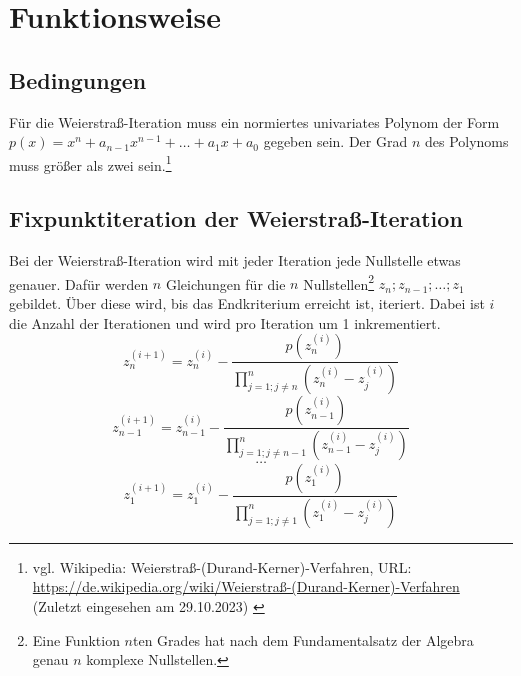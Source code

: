 \documentclass[12pt]{article}
\begin{document}
\section{Funktionsweise}
\subsection{Bedingungen}
Für die Weierstraß-Iteration muss ein normiertes univariates Polynom der Form $p(x) = x^n + a_{n-1} x^{n-1} + \dots + a_1 x + a_0$ gegeben sein. Der Grad $n$ des Polynoms muss größer als zwei sein.\footnote{
    vgl. Wikipedia: Weierstraß-(Durand-Kerner)-Verfahren, URL: \url{https://de.wikipedia.org/wiki/Weierstraß-(Durand-Kerner)-Verfahren} (Zuletzt eingesehen am 29.10.2023)
    \label{ftn:Wikipedia-Weierstraß-Methode}
}

\subsection{Fixpunktiteration der Weierstraß-Iteration}
Bei der Weierstraß-Iteration wird mit jeder Iteration jede Nullstelle etwas genauer. Dafür werden $n$ Gleichungen für die $n$ Nullstellen\footnote{Eine Funktion $n$ten Grades hat nach dem Fundamentalsatz der Algebra genau $n$ komplexe Nullstellen.} $z_n;z_{n-1};\dots;z_1$ gebildet. Über diese wird, bis das Endkriterium erreicht ist, iteriert. Dabei ist $i$ die Anzahl der Iterationen und wird pro Iteration um 1 inkrementiert.
\[z_n^{(i+1)} = z_n^{(i)} - \frac{p(z_n^{(i)})}{\prod_{j=1;j\neq n}^{n}(z_n^{(i)}-z_j^{(i)})}\]
\[z_{n-1}^{(i+1)} = z_{n-1}^{(i)} - \frac{p(z_{n-1}^{(i)})}{\prod_{j=1;j\neq n-1}^{n}(z_{n-1}^{(i)}-z_j^{(i)})}\]
\vspace{0.25mm}
\[\dots\]
\[z_{1}^{(i+1)} = z_1^{(i)} - \frac{p(z_{1}^{(i)})}{\prod_{j=1;j\neq 1}^{n}(z_{1}^{(i)}-z_j^{(i)})}\]
\end{document}
